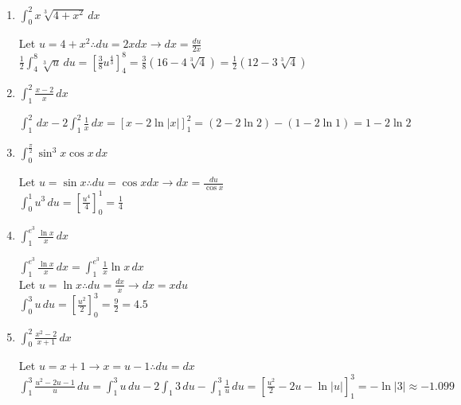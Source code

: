 \documentclass[10pt, letterpaper]{report}
\begin{document}
\begin{enumerate}
  \item{$\int_{0}^{2}x\sqrt[3]{4+x^{2}}\,dx$ \\}

    Let $u=4+x^{2}\therefore du=2xdx\rightarrow dx=\frac{du}{2x}$ \\

    $\frac{1}{2}\int_{4}^{8}{\sqrt[3]{u}}\,du=[\frac{3}{8}u^{\frac{4}{3}}]_{4}^{8}=
    \frac{3}{8}(16-4\sqrt[3]{4})=\frac{1}{2}(12-3\sqrt[3]{4})$ \\

  \item{$\int_{1}^{2}{\frac{x-2}{x}}\,dx$ \\}

      $ \int_{1}^{2}\,dx-2\int_{1}^{2}{\frac{1}{x}}\,dx=[x-2\ln{|x|}]_{1}^{2}=
      (2-2\ln{2})-(1-2\ln{1})=1-2\ln{2}$ \\

  \item{$\int_{0}^{\frac{\pi}{2}}{\sin^{3}{x}\cos{x}}\,dx$ \\}

      Let $u=\sin{x}\therefore du=\cos{x}dx\rightarrow dx=\frac{du}{\cos{x}}$ \\

      $\int_{0}^{1}{u^{3}}\,du=[\frac{u^{4}}{4}]_{0}^{1}=\frac{1}{4}$ \\

  \item{$\int_{1}^{e^{3}}{\frac{\ln{x}}{x}}\,dx$ \\}

    $\int_{1}^{e^{3}}{\frac{\ln{x}}{x}}\,dx = \int_{1}^{e^{3}}{\frac{1}{x}\ln{x}}\,dx$ \\

    Let $u=\ln{x}\therefore du=\frac{dx}{x}\rightarrow dx=xdu$ \\

    $\int_{0}^{3}{u}\,du=[\frac{u^{2}}{2}]_{0}^{3}=\frac{9}{2}=4.5$ \\

  \item{$\int_{0}^{2}{\frac{x^{2}-2}{x+1}}\,dx$ \\}

    Let $u=x+1\rightarrow x=u-1\therefore du=dx$ \\

    $\int_{1}^{3}{\frac{u^{2}-2u-1}{u}}\,du=
    \int_{1}^{3}{u}\,du-2\int_{1}{3}\,du-\int_{1}^{3}{\frac{1}{u}}\,du=
    [\frac{u^{2}}{2}-2u-\ln{|u|}]_{1}^{3}=-\ln{|3|}\approx-1.099$ \\


\end{enumerate}
\end{document}
